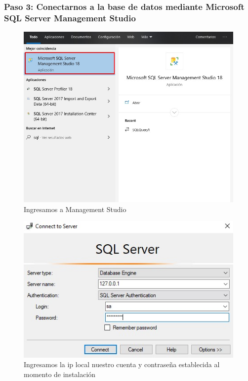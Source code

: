 \documentclass[preprint,12pt]{elsarticle}
\begin{document}
\subsubsection{\textbf{Paso 3: Conectarnos a la base de datos mediante Microsoft SQL Server Management Studio}}
\begin{figure}[H]
	\begin{center}
		\includegraphics[width=12cm]{./IMAGENES/foto12} 
		\caption{Ingresamos a Management Studio}
	\end{center}
\end{figure}

\begin{figure}[H]
	\begin{center}
		\includegraphics[width=12cm]{./IMAGENES/foto13} 
		\caption{Ingresamos la ip local nuestro cuenta y contraseña establecida al momento de instalación}
	\end{center}
\end{figure}
\end{document}
